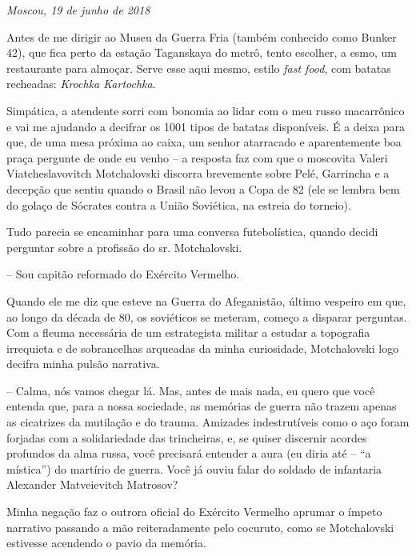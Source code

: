 \begin{flushright}
\emph{Moscou, 19 de junho de 2018}
\end{flushright}

Antes de me dirigir ao Museu da Guerra Fria (também conhecido como
Bunker 42), que fica perto da estação Taganskaya do metrô, tento
escolher, a esmo, um restaurante para almoçar. Serve esse aqui mesmo,
estilo \emph{fast food}, com batatas recheadas: \emph{Krochka
Kartochka}.

Simpática, a atendente sorri com bonomia ao lidar com o meu russo
macarrônico e vai me ajudando a decifrar os 1001 tipos de batatas
disponíveis. É a deixa para que, de uma mesa próxima ao caixa, um senhor
atarracado e aparentemente boa praça pergunte de onde eu venho -- a
resposta faz com que o moscovita Valeri Viatcheslavovitch Motchalovski
discorra brevemente sobre Pelé, Garrincha e a decepção que sentiu quando
o Brasil não levou a Copa de 82 (ele se lembra bem do golaço de Sócrates
contra a União Soviética, na estreia do torneio).

Tudo parecia se encaminhar para uma conversa futebolística, quando
decidi perguntar sobre a profissão do sr. Motchalovski.

-- Sou capitão reformado do Exército Vermelho.

Quando ele me diz que esteve na Guerra do Afeganistão, último vespeiro
em que, ao longo da década de 80, os soviéticos se meteram, começo a
disparar perguntas. Com a fleuma necessária de um estrategista militar a
estudar a topografia irrequieta e de sobrancelhas arqueadas da minha
curiosidade, Motchalovski logo decifra minha pulsão narrativa.

-- Calma, nós vamos chegar lá. Mas, antes de mais nada, eu quero que
você entenda que, para a nossa sociedade, as memórias de guerra não
trazem apenas as cicatrizes da mutilação e do trauma. Amizades
indestrutíveis como o aço foram forjadas com a solidariedade das
trincheiras, e, se quiser discernir acordes profundos da alma russa,
você precisará entender a aura (eu diria até -- ``a mística'') do
martírio de guerra. Você já ouviu falar do soldado de infantaria
Alexander Matveievitch Matrosov?

Minha negação faz o outrora oficial do Exército Vermelho aprumar o
ímpeto narrativo passando a mão reiteradamente pelo cocuruto, como se
Motchalovski estivesse acendendo o pavio da memória.

